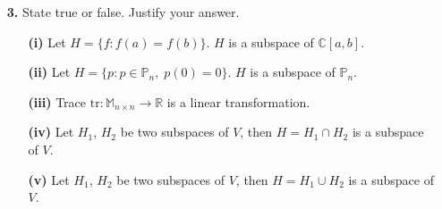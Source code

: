 \documentclass[ 12pt ]{article}
\begin{document}
\begin{enumerate}
		\begin{proof}
			Suppose $T : \mathbb{M}_{n \times n} \to \mathbb{M}_{n \times n}$ such that $T(A) = A + A^T$.
			\begin{enumerate}
				\item[\textbf{(i)}] To show that $T$ is a linear transformation, we need to show additivity and homogeneity. Let $A, B \in \mathbb{M}_{2 \times 2}$ and
					$\alpha, \beta \in \mathbb{R}$. Observe that
					\begin{align*}
						T(\alpha A + \beta B) &= (\alpha A + \beta B) + (\alpha A + \beta B)^T \\
						&= \alpha A + \beta B + \alpha A^T + \beta B^T \\
						&= \alpha(A + A^T) + \beta(B + B^T) \\
						T(\alpha A + \beta B) &= \alpha T(A) + \beta T(B).
					\end{align*}
					Thus, $T$ is a linear transformation.

				\item[\textbf{(ii)}] To find $\ker T$, we need to find the set of all matrices $A \in \mathbb{M}_{2 \times 2}$ such that $T(A) = A + A^T = 0_{2 \times 2}$, where
					$0_{2 \times 2}$ is clearly the additive indentity of $\mathbb{M}_{2 \times 2}$. For $A$ to satisfy this equation, the following must hold $-A = A^T$. Furthermore,
					we can see that $A$ must be skew-symmetric. Thus, $\ker T = \{ A \in \mathbb{M}_{2 \times 2} : -A = A^T \}$.

				\item[\textbf{(iii)}] Observe that $T(A) = A + A^T$ produces symmetric matrices from $\mathbb{M}_{2 \times 2}$. Let $B \in \mathbb{M}_{2 \times 2}$ be a symmetric
					matrix. Notice that $$T \left ( \frac{1}{2} B \right ) = \frac{1}{2} B + \frac{1}{2}B^T = \frac{1}{2} B + \frac{1}{2}B = B.$$ Then it can be seen that the range of
					$T$ is exclusively symmetric matrices and every symmetric matrix has a corresponding pre-image. Thus, $\mathrm{range} T = \{ B \in \mathbb{M}_{2 \times 2} :
					B = B^T \}$.
			\end{enumerate}
		\end{proof}


	\item[\textbf{3.}] State true or false. Justify your answer.
		\begin{enumerate}
			\item[\textbf{(i)}] Let $H = \{ f : f(a) = f(b) \}$. $H$ is a subspace of $\mathbb{C}[a,b]$.
			\item[\textbf{(ii)}] Let $H = \{ p : p \in \mathbb{P}_n,\; p(0) = 0 \}$. $H$ is a subspace of $\mathbb{P}_n$.
			\item[\textbf{(iii)}] Trace $\mathrm{tr} : \mathbb{M}_{n \times n} \to \mathbb{R}$ is a linear transformation.
			\item[\textbf{(iv)}] Let $H_1$, $H_2$ be two subspaces of $V$, then $H = H_1 \cap H_2$ is a subspace of $V$.
			\item[\textbf{(v)}] Let $H_1$, $H_2$ be two subspaces of $V$, then $H = H_1 \cup H_2$ is a subspace of $V$.
		\end{enumerate}


\end{enumerate}
\end{document}
